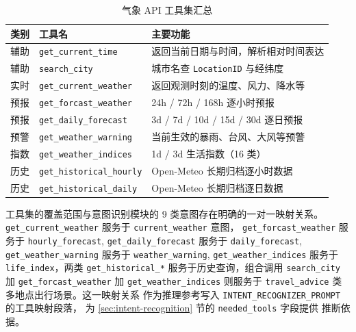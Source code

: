 \documentclass[a4paper]{article}
\newcommand{\song}{\CJKfamily{song}}
\theoremstyle{definition}
\theoremstyle{plain}
\theoremstyle{remark}
\newcommand{\bk}{\discretionary{}{}{}}
\begin{document}
\begin{table}[!ht]
    \centering
    \caption{气象 API 工具集汇总}
    \label{tab:api-tools-overview}
    \song\fontsize{9pt}{12pt}\selectfont
    \renewcommand{\arraystretch}{0.95}
    \begin{tabular}{lll}
        \toprule
        类别 & 工具名 & 主要功能 \\
        \midrule
        辅助 & \texttt{get\_\bk{}current\_\bk{}time} & 返回当前日期与时间，解析相对时间表达 \\
        辅助 & \texttt{search\_\bk{}city} & 城市名查 \texttt{LocationID} 与经纬度 \\
        \midrule
        实时 & \texttt{get\_\bk{}current\_\bk{}weather} & 返回观测时刻的温度、风力、降水等 \\
        预报 & \texttt{get\_\bk{}forcast\_\bk{}weather} & 24h / 72h / 168h 逐小时预报 \\
        预报 & \texttt{get\_\bk{}daily\_\bk{}forecast} & 3d / 7d / 10d / 15d / 30d 逐日预报 \\
        预警 & \texttt{get\_\bk{}weather\_\bk{}warning} & 当前生效的暴雨、台风、大风等预警 \\
        指数 & \texttt{get\_\bk{}weather\_\bk{}indices} & 1d / 3d 生活指数（16 类） \\
        \midrule
        历史 & \texttt{get\_\bk{}historical\_\bk{}hourly} & Open-Meteo 长期归档逐小时数据 \\
        历史 & \texttt{get\_\bk{}historical\_\bk{}daily} & Open-Meteo 长期归档逐日数据 \\
        \bottomrule
    \end{tabular}
\end{table}

工具集的覆盖范围与意图识别模块的 9 类意图存在明确的一对一映射关系。
\texttt{get\_\bk{}current\_\bk{}weather} 服务于 \texttt{current\_\bk{}weather} 意图，
\texttt{get\_\bk{}forcast\_\bk{}weather} 服务于 \texttt{hourly\_\bk{}forecast},
\texttt{get\_\bk{}daily\_\bk{}forecast} 服务于 \texttt{daily\_\bk{}forecast},
\texttt{get\_\bk{}weather\_\bk{}warning} 服务于 \texttt{weather\_\bk{}warning},
\texttt{get\_\bk{}weather\_\bk{}indices} 服务于 \texttt{life\_\bk{}index}，两类
\texttt{get\_\bk{}historical\_\bk{}*} 服务于历史查询，组合调用 \texttt{search\_\bk{}city}
加 \texttt{get\_\bk{}forcast\_\bk{}weather} 加 \texttt{get\_\bk{}weather\_\bk{}indices}
则服务于 \texttt{travel\_\bk{}advice} 类多地点出行场景。这一映射关系
作为推理参考写入 \texttt{INTENT\_\bk{}RECOGNIZER\_\bk{}PROMPT} 的工具映射段落，
为 \ref{sec:intent-recognition} 节的 \texttt{needed\_\bk{}tools} 字段提供
推断依据。
\end{document}
